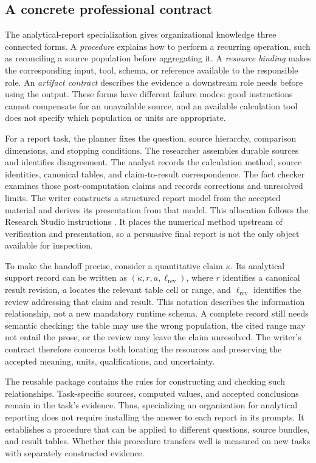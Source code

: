 \subsection{A concrete professional contract}\label{sec:contract}
The analytical-report specialization gives organizational knowledge three connected forms. A \emph{procedure} explains how to perform a recurring operation, such as reconciling a source population before aggregating it. A \emph{resource binding} makes the corresponding input, tool, schema, or reference available to the responsible role. An \emph{artifact contract} describes the evidence a downstream role needs before using the output. These forms have different failure modes: good instructions cannot compensate for an unavailable source, and an available calculation tool does not specify which population or units are appropriate.

For a report task, the planner fixes the question, source hierarchy, comparison dimensions, and stopping conditions. The researcher assembles durable sources and identifies disagreement. The analyst records the calculation method, source identities, canonical tables, and claim-to-result correspondence. The fact checker examines those post-computation claims and records corrections and unresolved limits. The writer constructs a structured report model from the accepted material and derives its presentation from that model. This allocation follows the Research Studio instructions \citep{ocsource}. It places the numerical method upstream of verification and presentation, so a persuasive final report is not the only object available for inspection.

To make the handoff precise, consider a quantitative claim $\kappa$. Its analytical support record can be written as $(\kappa,r,a,\ell_{\mathrm{rev}})$, where $r$ identifies a canonical result revision, $a$ locates the relevant table cell or range, and $\ell_{\mathrm{rev}}$ identifies the review addressing that claim and result. This notation describes the information relationship, not a new mandatory runtime schema. A complete record still needs semantic checking: the table may use the wrong population, the cited range may not entail the prose, or the review may leave the claim unresolved. The writer's contract therefore concerns both locating the resources and preserving the accepted meaning, units, qualifications, and uncertainty.

The reusable package contains the rules for constructing and checking such relationships. Task-specific sources, computed values, and accepted conclusions remain in the task's evidence. Thus, specializing an organization for analytical reporting does not require installing the answer to each report in its prompts. It establishes a procedure that can be applied to different questions, source bundles, and result tables. Whether this procedure transfers well is measured on new tasks with separately constructed evidence.
